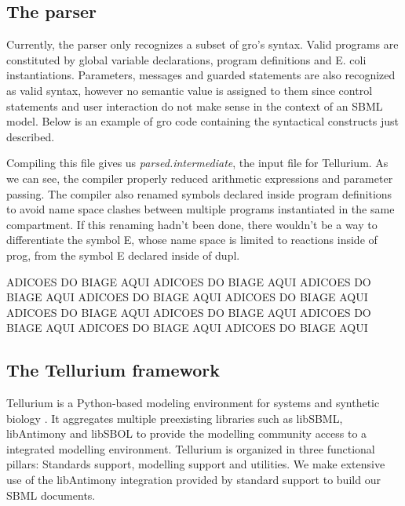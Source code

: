 \documentclass[12pt]{article}
\begin{document}
\subsection{The parser}
    
    Currently, the parser only recognizes a subset of gro's syntax. Valid programs are constituted by global variable declarations, program definitions and E. coli instantiations. Parameters, messages and guarded statements are also recognized as valid syntax, however no semantic value is assigned to them since control statements and user interaction do not make sense in the context of an SBML model. Below is an example of gro code containing the syntactical constructs just described.
    
    
    
    Compiling this file gives us \textit{parsed.intermediate}, the input file for Tellurium. As we can see, the compiler properly reduced arithmetic expressions and parameter passing. The compiler also renamed symbols declared inside program definitions to avoid name space clashes between multiple programs instantiated in the same compartment. If this renaming hadn't been done, there wouldn't be a way to differentiate the symbol E, whose name space is limited to reactions inside of prog, from the symbol E declared inside of dupl.
    
    ADICOES DO BIAGE AQUI ADICOES DO BIAGE AQUI ADICOES DO BIAGE AQUI ADICOES DO BIAGE AQUI ADICOES DO BIAGE AQUI ADICOES DO BIAGE AQUI ADICOES DO BIAGE AQUI ADICOES DO BIAGE AQUI ADICOES DO BIAGE AQUI ADICOES DO BIAGE AQUI
    
    
    
\subsection{The Tellurium framework}

    Tellurium is a Python-based modeling environment for systems and synthetic biology \cite{Choi2018}. It aggregates multiple preexisting libraries such as libSBML, libAntimony and libSBOL to provide the modelling community access to a integrated modelling environment. Tellurium is organized in three functional pillars: Standards support, modelling support and utilities. We make extensive use of the libAntimony integration provided by standard support to build our SBML documents.
\end{document}
